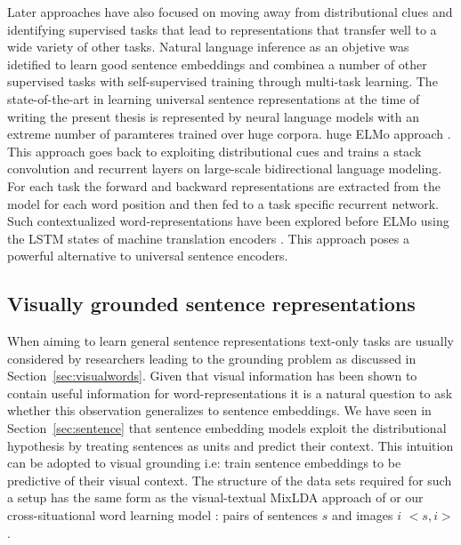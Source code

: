 Later approaches have also focused on moving away from distributional clues
and identifying supervised tasks that lead to representations that transfer
well to a wide variety of other tasks. Natural language inference as an objetive
was idetified to learn good sentence embeddings \cite{conneau-EtAl:2017:EMNLP2017}
and \cite{subramanian2018learning} combinea a number of other supervised tasks
with self-supervised training through multi-task learning.
The state-of-the-art in learning universal sentence representations
at the time of writing the present thesis is
represented by neural language models with an extreme number of paramteres
trained over huge corpora. huge ELMo approach \cite{peters2018deep}. This approach goes back to
exploiting distributional cues and trains a stack convolution and recurrent layers
on large-scale bidirectional language modeling.
For each task the forward and backward representations are extracted from the model
for each word position and then fed to a task specific recurrent network.
Such contextualized word-representations have been explored before ELMo using
the LSTM states of machine translation encoders \cite{mccann2017learned}.
This approach poses a powerful alternative to universal sentence encoders.

\subsection{Visually grounded sentence representations}
\label{sec:visualsentences}

When aiming to learn general sentence representations text-only tasks
are usually considered by researchers leading to the grounding problem
as discussed in Section~\ref{sec:visualwords}. Given that visual information
has been shown to contain useful information for word-representations it
is a natural question to ask whether this observation generalizes to sentence
embeddings. We have seen in Section~\ref{sec:sentence} that sentence embedding
models exploit the distributional hypothesis by treating sentences as units and
predict their context. This intuition can be adopted to visual grounding i.e:
train sentence embeddings to be predictive of their visual context. The
structure of the data sets required for such a setup has the same form
as the visual-textual MixLDA approach of \cite{feng2010visual} or our
cross-situational word learning model \cite{kadar2015learning}:
pairs of sentences $s$ and images $i$ $<s, i>$.

